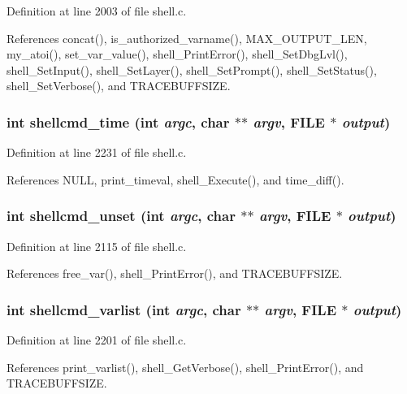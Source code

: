 Definition at line 2003 of file shell.c.

References concat(), is\_\-authorized\_\-varname(), MAX\_\-OUTPUT\_\-LEN, my\_\-atoi(), set\_\-var\_\-value(), shell\_\-Print\-Error(), shell\_\-Set\-Dbg\-Lvl(), shell\_\-Set\-Input(), shell\_\-Set\-Layer(), shell\_\-Set\-Prompt(), shell\_\-Set\-Status(), shell\_\-Set\-Verbose(), and TRACEBUFFSIZE.
\subsubsection{\setlength{\rightskip}{0pt plus 5cm}int shellcmd\_\-time (int {\em argc}, char $\ast$$\ast$ {\em argv}, FILE $\ast$ {\em output})}\label{shell_8h_a39}




Definition at line 2231 of file shell.c.

References NULL, print\_\-timeval, shell\_\-Execute(), and time\_\-diff().
\subsubsection{\setlength{\rightskip}{0pt plus 5cm}int shellcmd\_\-unset (int {\em argc}, char $\ast$$\ast$ {\em argv}, FILE $\ast$ {\em output})}\label{shell_8h_a36}




Definition at line 2115 of file shell.c.

References free\_\-var(), shell\_\-Print\-Error(), and TRACEBUFFSIZE.
\subsubsection{\setlength{\rightskip}{0pt plus 5cm}int shellcmd\_\-varlist (int {\em argc}, char $\ast$$\ast$ {\em argv}, FILE $\ast$ {\em output})}\label{shell_8h_a38}




Definition at line 2201 of file shell.c.

References print\_\-varlist(), shell\_\-Get\-Verbose(), shell\_\-Print\-Error(), and TRACEBUFFSIZE.